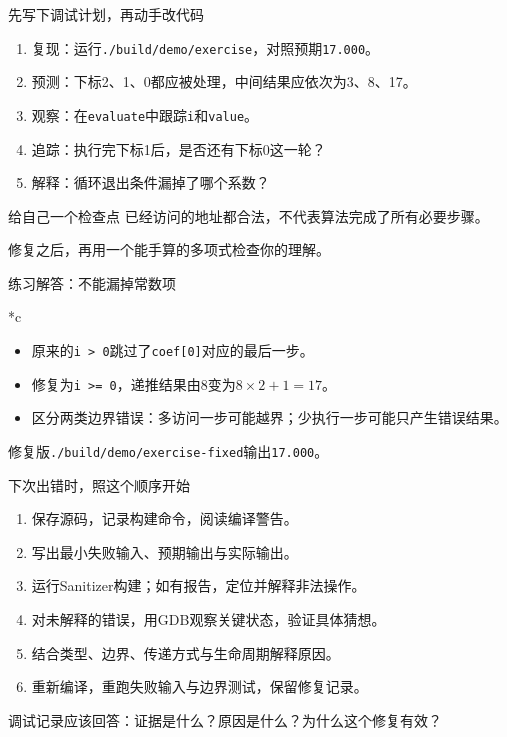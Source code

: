 \begin{frame}{先写下调试计划，再动手改代码}
    \begin{enumerate}
        \item \alert{复现}：运行\texttt{./build/demo/exercise}，对照预期\texttt{17.000}。
        \item \alert{预测}：下标2、1、0都应被处理，中间结果应依次为3、8、17。
        \item \alert{观察}：在\texttt{evaluate}中跟踪\texttt{i}和\texttt{value}。
        \item \alert{追踪}：执行完下标1后，是否还有下标0这一轮？
        \item \alert{解释}：循环退出条件漏掉了哪个系数？
    \end{enumerate}
    \medskip
    \begin{vspquotered}{给自己一个检查点}
        已经访问的地址都合法，不代表算法完成了所有必要步骤。\par
        修复之后，再用一个能手算的多项式检查你的理解。
    \end{vspquotered}
\end{frame}

\begin{frame}{练习解答：不能漏掉常数项}
    \begin{Code}*{c}
        
    \end{Code}
    \begin{itemize}
        \item 原来的\texttt{i > 0}跳过了\texttt{coef[0]}对应的最后一步。
        \item 修复为\texttt{i >= 0}，递推结果由8变为$8\times2+1=17$。
        \item 区分两类边界错误：\alert{多访问一步可能越界；少执行一步可能只产生错误结果}。
    \end{itemize}
    \medskip
    修复版\texttt{./build/demo/exercise-fixed}输出\texttt{17.000}。
\end{frame}

\begin{frame}{下次出错时，照这个顺序开始}
    \begin{enumerate}
        \item 保存源码，记录构建命令，阅读编译警告。
        \item 写出最小失败输入、预期输出与实际输出。
        \item 运行Sanitizer构建；如有报告，定位并解释非法操作。
        \item 对未解释的错误，用GDB观察关键状态，验证具体猜想。
        \item 结合类型、边界、传递方式与生命周期解释原因。
        \item 重新编译，重跑失败输入与边界测试，保留修复记录。
    \end{enumerate}
    \medskip
    \alert{调试记录应该回答：证据是什么？原因是什么？为什么这个修复有效？}
\end{frame}

